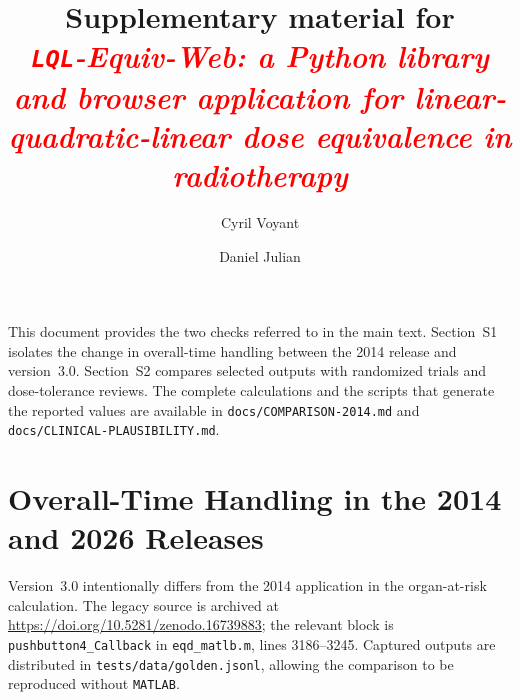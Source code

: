 \documentclass[preprint,12pt,number]{elsarticle}
\newcommand{\cyr}[1]{\textcolor{red}{#1}}
\begin{document}
\begin{frontmatter}
\title{Supplementary material for\\
       \emph{\cyr{\texttt{LQL}-Equiv-Web: a Python library and browser application for linear-quadratic-linear dose equivalence in radiotherapy}}}
\author[label1]{Cyril Voyant}
\author[label2]{Daniel Julian}
\end{frontmatter}

This document provides the two checks referred to in the main text. Section~S1 isolates the change in overall-time handling between the 2014 release and
version~3.0. Section~S2 compares selected outputs with randomized trials and dose-tolerance reviews. The complete calculations and the scripts that generate
the reported values are available in \texttt{docs/COMPARISON-2014.md} and \texttt{docs/CLINICAL-PLAUSIBILITY.md}.

\section{Overall-Time Handling in the 2014 and 2026 Releases} \label{app:2014}
Version~3.0 intentionally differs from the 2014 application in the organ-at-risk calculation. The legacy source is archived at \url{https://doi.org/10.5281/zenodo.16739883}; the relevant block is \texttt{pushbutton4\_Callback} in \texttt{eqd\_matlb.m}, lines 3186--3245. Captured outputs are distributed in \texttt{tests/data/golden.jsonl}, allowing the comparison to be reproduced without \texttt{MATLAB}.
\end{document}
